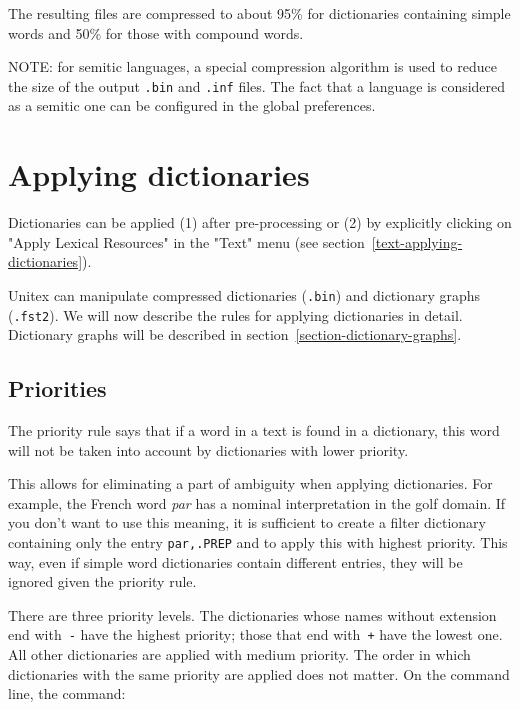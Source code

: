 \bigskip
\noindent The resulting files are compressed to about 95\% for dictionaries containing
simple words and 50\% for those with compound words.

\bigskip
\noindent NOTE: for semitic languages, a special compression algorithm is used to reduce the size of
                the output \verb+.bin+ and \verb+.inf+ files. The fact that a language is considered as
                a semitic one can be configured in the global preferences.
\section{Applying dictionaries}
\label{section-applying-dictionaries}
Dictionaries can be applied (1) after pre-processing or (2) by explicitly 
clicking on "Apply Lexical Resources" in the  "Text" menu (see
section~\ref{text-applying-dictionaries}).

\bigskip
\noindent Unitex can manipulate compressed dictionaries (\verb+.bin+) and
dictionary graphs (\verb+.fst2+). We will now describe  the rules for applying dictionaries
in detail. Dictionary graphs will be described in
section~\ref{section-dictionary-graphs}.

\subsection{Priorities}
\label{section-dictionary-priorities}
The priority rule says that  if a word in a text is found in a dictionary, this
word will not be taken into account by dictionaries with lower priority.

\bigskip
\noindent This allows for eliminating a part of ambiguity when applying
dictionaries. For example, the French word \textit{par} has a nominal interpretation in the golf
domain. If you don't want to use this meaning, it is sufficient to create a
filter dictionary containing only the entry \verb$par,.PREP$ and to apply this
with highest priority. This way, even if simple word dictionaries contain 
different entries, they will be ignored given the priority rule.

\bigskip
\noindent There are three priority levels. The dictionaries whose names without
extension end with~\verb+-+
\index{\verb+-+}\index{\verb$+$}
have the highest priority; those that end with~\verb-+- have the lowest one.
All other dictionaries are applied with medium priority. The order in which
dictionaries with the same priority are applied does not matter.
On the command line, the command:


